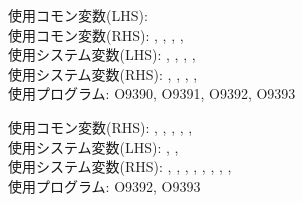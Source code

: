 \clearpage

\begin{hosoku}\small
使用コモン変数(LHS): \\
使用コモン変数(RHS): , , , , \\
使用システム変数(LHS): , , , , \\
使用システム変数(RHS): , , , , \\
使用プログラム: O9390, O9391, O9392, O9393
\end{hosoku}


\clearpage

\begin{hosoku}\small
使用コモン変数(RHS): , , , , , \\
使用システム変数(LHS): , , \\
使用システム変数(RHS): , , , , , , , , \\
使用プログラム: O9392, O9393
\end{hosoku}


